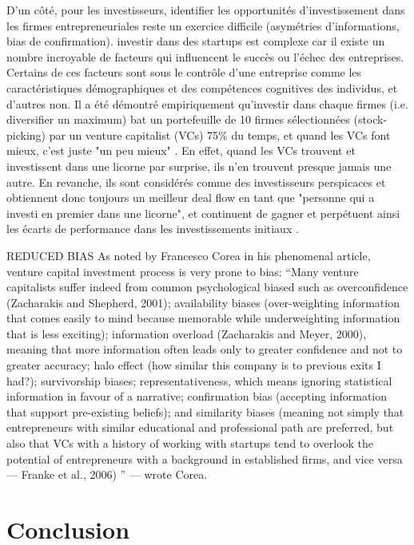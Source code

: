 \documentclass[12pt]{article}
\begin{document}
D'un côté, pour les investisseurs, identifier les opportunités d'investissement dans les firmes entrepreneuriales reste un exercice difficile (asymétries d'informations, bias de confirmation). investir dans des startups est complexe car il existe un nombre incroyable de facteurs qui influencent le succès ou l'échec des entreprises. Certains de ces facteurs sont sous le contrôle d'une entreprise comme les caractéristiques démographiques et des compétences cognitives des individus, et d'autres non. Il a été démontré empiriquement qu'investir dans chaque firmes (i.e. diversifier un maximum) bat un portefeuille de 10 firmes sélectionnées (stock-picking) par un venture capitalist (VCs) 75\% du temps, et quand les VCs font mieux, c'est juste "un peu mieux" \citep{othman2020angelistdata}. En effet, quand les VCs trouvent et investissent dans une licorne par surprise, ils n'en trouvent presque jamais une autre. En revanche, ils sont considérés comme des investisseurs perspicaces et obtiennent donc toujours un meilleur deal flow en tant que "personne qui a investi en premier dans une licorne", et continuent de gagner et perpétuent ainsi les écarts de performance dans les investissements initiaux \citep{nanda2020persistent}.


REDUCED BIAS
As noted by Francesco Corea in his phenomenal article, venture capital investment process is very prone to bias: “Many venture capitalists suffer indeed from common psychological biased such as overconfidence (Zacharakis and Shepherd, 2001); availability biases (over-weighting information that comes easily to mind because memorable while underweighting information that is less exciting); information overload (Zacharakis and Meyer, 2000), meaning that more information often leads only to greater confidence and not to greater accuracy; halo effect (how similar this company is to previous exits I had?); survivorship biases; representativeness, which means ignoring statistical information in favour of a narrative; confirmation bias (accepting information that support pre-existing beliefs); and similarity biases (meaning not simply that entrepreneurs with similar educational and professional path are preferred, but also that VCs with a history of working with startups tend to overlook the potential of entrepreneurs with a background in established firms, and vice versa — Franke et al., 2006) ” — wrote Corea.



\section{Conclusion}
\end{document}

